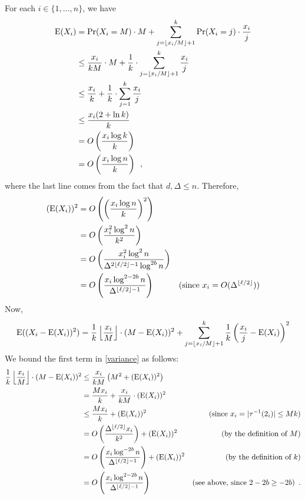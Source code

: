 \documentclass{patmorin}
\begin{document}
For each $i\in\{1,\ldots,n\}$, we have
\begin{align*}
  \mathrm{E}(X_i)
  & =\Pr(X_i=M)\cdot M + \sum_{j=\lfloor x_i/M\rfloor+1}^k \Pr(X_i=j)\cdot\frac{x_i}{j} \\
  & \le\frac{x_i}{kM}\cdot M + \frac{1}{k}\cdot\sum_{j=\lfloor x_i/M\rfloor+1}^k \frac{x_i}{j} \\
  & \le\frac{x_i}{k} + \frac{1}{k}\cdot\sum_{j=1}^k \frac{x_i}{j} \\
  & \le \frac{x_i(2+\ln k)}{k} \\
  & = O\left(\frac{x_i\log k}{k}\right) \\
  & = O\left(\frac{x_i\log n}{k}\right)
  \enspace ,
\end{align*}
where the last line comes from the fact that $d,\Delta \le n$.
Therefore,
\begin{align*}
  (\mathrm{E}(X_i))^2
  & = O\left(\left(\frac{x_i\log n}{k}\right)^2\right) \\
  & = O\left(\frac{x_i^2\log^2 n}{k^2}\right) \\
  & = O\left(\frac{x_i^2\log^2 n}{\Delta^{2\lfloor\ell/2\rfloor-1}\log^{2b} n}\right) \\
  & = O\left(\frac{x_i\log^{2-2b} n}{\Delta^{\lfloor\ell/2\rfloor-1}}\right)
  & \text{(since $x_i=O(\Delta^{\lfloor\ell/2\rfloor})$)} \\
\end{align*}
Now,
\begin{equation}
  \mathrm{E}((X_i-\mathrm{E}(X_i))^2)  = \frac{1}{k}\left\lfloor\frac{x_i}{M}\right\rfloor\cdot(M-\mathrm{E}(X_i))^2 + \sum_{j=\lfloor x_i/M\rfloor+1}^k \frac{1}{k}\left(\frac{x_i}{j}-\mathrm{E}(X_i)\right)^2 \label{variance}
\end{equation}
We bound the first term in \cref{variance} as follows:
\begin{align*}
  \frac{1}{k}\left\lfloor\frac{x_i}{M}\right\rfloor\cdot(M-\mathrm{E}(X_i))^2
  & \le \frac{x_i}{kM}\left(M^2 + (\mathrm{E}(X_i))^2\right) \\
  & = \frac{M x_i}{k} + \frac{x_i}{kM}\cdot (\mathrm{E}(X_i))^2 \\
  & \le \frac{M x_i}{k} + (\mathrm{E}(X_i))^2
  & \text{(since $x_i=|\tau^{-1}(2_i)|\le Mk$)}\\
  & = O\left(\frac{\Delta^{\lfloor\ell/2\rfloor}x_i}{k^2}\right) + (\mathrm{E}(X_i))^2
  & \text{(by the definition of $M$)}\\
  & = O\left(\frac{x_i\log^{-2b} n}{\Delta^{\lfloor\ell/2\rfloor-1}}\right) + (\mathrm{E}(X_i))^2
  & \text{(by the definition of $k$)}\\
  & = O\left(\frac{x_i\log^{2-2b} n}{\Delta^{\lfloor\ell/2\rfloor-1}}\right)
  & \text{(see above, since $2-2b\ge -2b$)} \enspace .
\end{align*}
\end{document}
